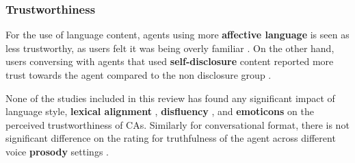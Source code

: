 \documentclass[sigconf,screen,review, anonymous]{acmart}
\newcommand{\cmt}[1]{}%
\begin{document}


\subsubsection{Trustworthiness}

For the use of language content, agents using more \textbf{affective language} is seen as less trustworthy, as users felt it was being overly familiar \cite{andrews2012system}\cmt{[38]}. On the other hand, users conversing with agents that used \textbf{self-disclosure} content reported more trust towards the agent compared to the non disclosure group \cite{lee2020hear}\cmt{[23]}.




None of the studies included in this review has found any significant impact of language style, \textbf{lexical alignment} \cite{hoegen2019end}\cmt{[31]}\cite{huiyang2022improving}\cmt{[17]}\cite{linnemann2018can}\cmt{[15]}, \textbf{disfluency} \cite{pfeifer2009should}\cmt{[12]}, and \textbf{emoticons} \cite{wilhelm2022keep}\cmt{[28]} on the perceived trustworthiness of CAs. Similarly for conversational format, there is not significant difference on the rating for truthfulness of the agent across different voice \textbf{prosody} settings \cite{dubiel2020persuasive}\cmt{[60]}.



\end{document}
